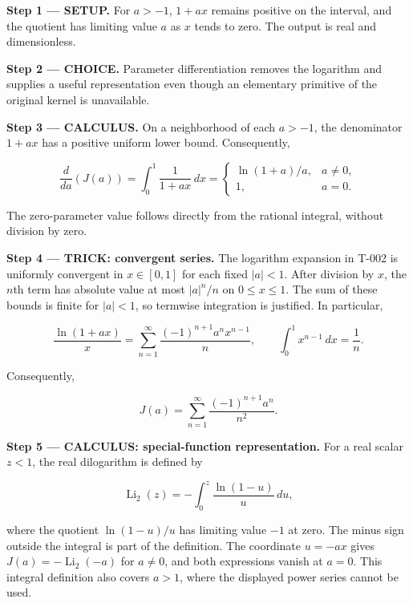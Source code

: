 \documentclass[11pt,oneside,openany]{book}
\begin{document}
\textbf{Step 1 --- SETUP.} For \(a>-1\), \(1+ax\) remains positive on the interval, and the quotient has limiting value \(a\) as \(x\) tends to zero. The output is real and dimensionless.

\begin{ChoiceStep}
\textbf{Step 2 --- CHOICE.} Parameter differentiation removes the logarithm and supplies a useful representation even though an elementary primitive of the original kernel is unavailable.

\end{ChoiceStep}
\textbf{Step 3 --- CALCULUS.} On a neighborhood of each \(a>-1\), the denominator \(1+ax\) has a positive uniform lower bound. Consequently,

\[
\frac{d}{da}\left(J(a)\right)=\int_0^1\frac1{1+ax}\,dx
=\begin{cases}\ln(1+a)/a,&a\ne0,\\1,&a=0.\end{cases}
\]

The zero-parameter value follows directly from the rational integral, without division by zero.

\begingroup\color{TrickPurple}
\textbf{Step 4 --- TRICK: convergent series.} The logarithm expansion in T-002 is uniformly convergent in \(x\in[0,1]\) for each fixed \(|a|<1\). After division by \(x\), the \(n\)th term has absolute value at most \(|a|^n/n\) on \(0\le x\le1\). The sum of these bounds is finite for \(|a|<1\), so termwise integration is justified. In particular,

\[
\frac{\ln(1+ax)}{x}
=\sum_{n=1}^{\infty}\frac{(-1)^{n+1}a^n x^{n-1}}{n},
\qquad
\int_0^1x^{n-1}\,dx=\frac1n.
\]

Consequently,

\[
J(a)=\sum_{n=1}^\infty\frac{(-1)^{n+1}a^n}{n^2}.
\]

\endgroup
\textbf{Step 5 --- CALCULUS: special-function representation.} For a real scalar \(z<1\), the real dilogarithm is defined by

\[
\operatorname{Li}_2(z)=-\int_0^z\frac{\ln(1-u)}{u}\,du,
\]

where the quotient \(\ln(1-u)/u\) has limiting value \(-1\) at zero. The minus sign outside the integral is part of the definition. The coordinate \(u=-ax\) gives \(J(a)=-\operatorname{Li}_2(-a)\) for \(a\ne0\), and both expressions vanish at \(a=0\). This integral definition also covers \(a>1\), where the displayed power series cannot be used.
\end{document}
